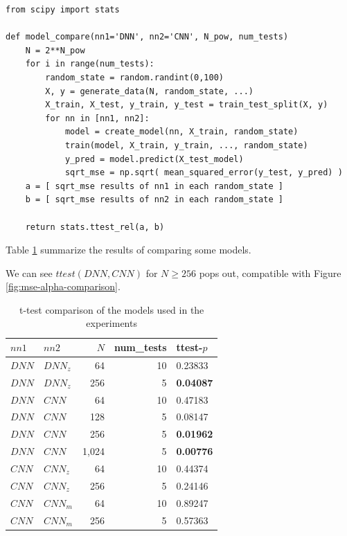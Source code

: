 \documentclass[a4paper, 12pt]{report}
\begin{document}
\begin{verbatim}
from scipy import stats

def model_compare(nn1='DNN', nn2='CNN', N_pow, num_tests)
    N = 2**N_pow
    for i in range(num_tests):
        random_state = random.randint(0,100)
        X, y = generate_data(N, random_state, ...)
        X_train, X_test, y_train, y_test = train_test_split(X, y)
        for nn in [nn1, nn2]:
            model = create_model(nn, X_train, random_state)
            train(model, X_train, y_train, ..., random_state)
            y_pred = model.predict(X_test_model)
            sqrt_mse = np.sqrt( mean_squared_error(y_test, y_pred) )
    a = [ sqrt_mse results of nn1 in each random_state ]
    b = [ sqrt_mse results of nn2 in each random_state ]

    return stats.ttest_rel(a, b)
\end{verbatim}

Table \ref{table:ttest-comparison} summarize the results of comparing some models.

We can see $ttest(DNN, CNN)$ for $N \geq 256$ pops out, compatible with Figure \ref{fig:mse-alpha-comparison}.

\begin{table}[h!]
    \scriptsize
    \centering
    \begin{tabular}{l l r r l} 
        $nn1$ & $nn2$ & $N$ & num\_tests & ttest-$p$ \\
        \hline
        $DNN$ & $DNN_z$ & 64 & 10 & 0.23833 \\ 
        $DNN$ & $DNN_z$ & 256 & 5 & \textbf{0.04087} \\ 
        $DNN$ & $CNN$ & 64 & 10 & 0.47183 \\ 
        $DNN$ & $CNN$ & 128 & 5 & 0.08147 \\ 
        \rowcolor{yellow}
        $DNN$ & $CNN$ & 256 & 5 & \textbf{0.01962} \\ 
        \rowcolor{yellow}
        $DNN$ & $CNN$ & 1,024 & 5 & \textbf{0.00776} \\ 
        $CNN$ & $CNN_z$ & 64 & 10 & 0.44374 \\ 
        $CNN$ & $CNN_z$ & 256 & 5 & 0.24146 \\ 
        $CNN$ & $CNN_m$ & 64 & 10 & 0.89247 \\ 
        $CNN$ & $CNN_m$ & 256 & 5 & 0.57363 \\ 
    \end{tabular}
    \caption{t-test comparison of the models used in the experiments}
    \label{table:ttest-comparison}
\end{table}
\end{document}
